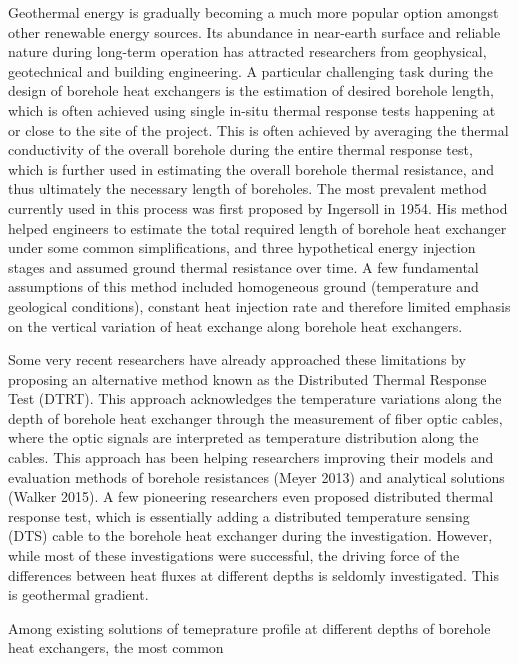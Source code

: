 Geothermal energy is gradually becoming a much more popular option amongst other renewable energy sources. Its abundance in near-earth surface and reliable nature during long-term operation has attracted researchers from geophysical, geotechnical and building engineering. A particular challenging task during the design of borehole heat exchangers is the estimation of desired borehole length, which is often achieved using single in-situ thermal response tests happening at or close to the site of the project. This is often achieved by averaging the thermal conductivity of the overall borehole during the entire thermal response test, which is further used in estimating the overall borehole thermal resistance, and thus ultimately the necessary length of boreholes. The most prevalent method currently used in this process was first proposed by Ingersoll in 1954. His method helped engineers to estimate the total required length of borehole heat exchanger under some common simplifications, and three hypothetical energy injection stages and assumed ground thermal resistance over time. A few fundamental assumptions of this method included homogeneous ground (temperature and geological conditions), constant heat injection rate and therefore limited emphasis on the vertical variation of heat exchange along borehole heat exchangers. 

Some very recent researchers have already approached these limitations by proposing an alternative method known as the Distributed Thermal Response Test (DTRT). This approach acknowledges the temperature variations along the depth of borehole heat exchanger through the measurement of fiber optic cables, where the optic signals are interpreted as temperature distribution along the cables. This approach has been helping researchers improving their models and evaluation methods of borehole resistances (Meyer 2013) and analytical solutions (Walker 2015). A few pioneering researchers even proposed distributed thermal response test, which is essentially adding a distributed temperature sensing (DTS) cable to the borehole heat exchanger during the investigation. However, while most of these investigations were successful, the driving force of the differences between heat fluxes at different depths is seldomly investigated. This is geothermal gradient. 

Among existing solutions of temeprature profile at different depths of borehole heat exchangers, the most common 

